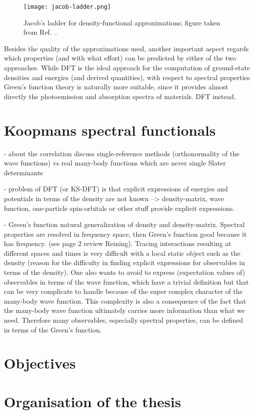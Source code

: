 \begin{figure}
    \centering
    \texttt{[image: jacob-ladder.png]}
    \caption[Jacob's ladder for density-functional approximations]{Jacob's ladder for density-functional approximations; figure taken from Ref.~\cite{perdew_jacobs_2001}.}
    \label{fig:jacob-ladder}
\end{figure}

Besides the quality of the approximations used, another important aspect regards which properties (and with what effort) can be predicted by either of the two approaches. While DFT is the ideal approach for the computation of ground-state densities and energies (and derived quantities), with respect to spectral properties Green's function theory is naturally more suitable, since it provides almost directly the photoemission and absorption spectra of materials. DFT instead,


\section{Koopmans spectral functionals\label{sec:intro-koopmans}}
- about the correlation discuss single-reference methods (orthonormality of the wave functions) vs real many-body functions which are never single Slater determinants

- problem of DFT (or KS-DFT) is that explicit expressions of energies and potentials in terms of the density are not known --> density-matrix, wave function, one-particle spin-orbitals or other stuff provide explicit expressions.

- Green's function natural generalization of density and density-matrix. Spectral properties are resolved in frequency space, then Green's function good because it has frequency. (see page 2 review Reining). Tracing interactions resulting at different spaces and times is very difficult with a local static object such as the density (reason for the difficulty in finding explicit expressions for observables in terms of the density). One also wants to avoid to express (expectation values of) observables in terms of the wave function, which have a trivial definition but that can be very complicate to handle because of the super complex character of the many-body wave function. This complexity is also a consequence of the fact that the many-body wave function ultimately carries more information than what we need. Therefore many observables, especially spectral properties, can be defined in terms of the Green's function.

\section{Objectives\label{sec:objectives}}

\section{Organisation of the thesis\label{sec:organization-thesis}}

